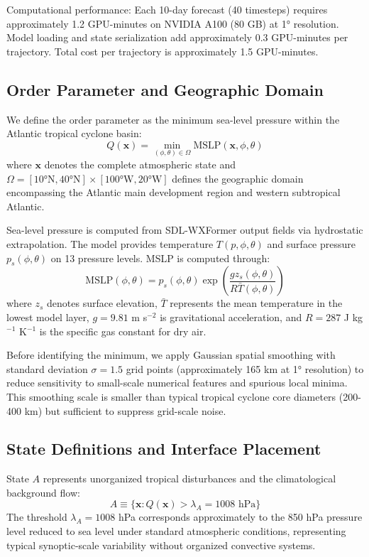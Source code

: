 \documentclass[11pt]{article}
\begin{document}
Computational performance: Each 10-day forecast (40 timesteps) requires approximately 1.2 GPU-minutes on NVIDIA A100 (80 GB) at 1° resolution. Model loading and state serialization add approximately 0.3 GPU-minutes per trajectory. Total cost per trajectory is approximately 1.5 GPU-minutes.

\subsection{Order Parameter and Geographic Domain}

We define the order parameter as the minimum sea-level pressure within the Atlantic tropical cyclone basin:
\begin{equation}
Q(\mathbf{x}) = \min_{(\phi,\theta) \in \Omega} \text{MSLP}(\mathbf{x}, \phi, \theta)
\end{equation}
where $\mathbf{x}$ denotes the complete atmospheric state and $\Omega = [10°\text{N}, 40°\text{N}] \times [100°\text{W}, 20°\text{W}]$ defines the geographic domain encompassing the Atlantic main development region and western subtropical Atlantic.

Sea-level pressure is computed from SDL-WXFormer output fields via hydrostatic extrapolation. The model provides temperature $T(p, \phi, \theta)$ and surface pressure $p_s(\phi, \theta)$ on 13 pressure levels. MSLP is computed through:
\begin{equation}
\text{MSLP}(\phi, \theta) = p_s(\phi, \theta) \exp\left(\frac{g z_s(\phi, \theta)}{R \bar{T}(\phi, \theta)}\right)
\end{equation}
where $z_s$ denotes surface elevation, $\bar{T}$ represents the mean temperature in the lowest model layer, $g = 9.81$ m s$^{-2}$ is gravitational acceleration, and $R = 287$ J kg$^{-1}$ K$^{-1}$ is the specific gas constant for dry air.

Before identifying the minimum, we apply Gaussian spatial smoothing with standard deviation $\sigma = 1.5$ grid points (approximately 165 km at 1° resolution) to reduce sensitivity to small-scale numerical features and spurious local minima. This smoothing scale is smaller than typical tropical cyclone core diameters (200-400 km) but sufficient to suppress grid-scale noise.

\subsection{State Definitions and Interface Placement}

State $A$ represents unorganized tropical disturbances and the climatological background flow:
\begin{equation}
A \equiv \{\mathbf{x} : Q(\mathbf{x}) > \lambda_A = 1008 \text{ hPa}\}
\end{equation}
The threshold $\lambda_A = 1008$ hPa corresponds approximately to the 850 hPa pressure level reduced to sea level under standard atmospheric conditions, representing typical synoptic-scale variability without organized convective systems.
\end{document}
